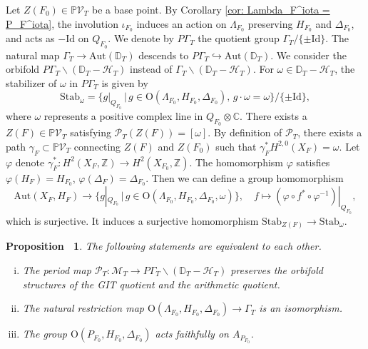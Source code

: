 \documentclass[12pt,reqno,a4paper]{amsart}
\newtheorem{prop}[thm]{Proposition~}
\theoremstyle{remark}
\theoremstyle{definition}
\begin{document}
Let $Z(F_0)\in\mathbb{P}\mathcal{V}_T$ be a base point.
By Corollary \ref{cor: Lambda_F^iota = P_F^iota}, the involution $\iota_{F_0}$ induces an action on $\Lambda_{F_0}$ preserving $H_{F_0}$ and $\Delta_{F_0}$, and acts as $-\mathrm{Id}$ on $Q_{F_0}$.
We denote by $P\Gamma_T$ the quotient group $\Gamma_T/\{\pm \mathrm{Id}\}$. The natural map $\Gamma_T \to \mathrm{Aut}(\mathbb{D}_T)$ descends to $P\Gamma_T \hookrightarrow \mathrm{Aut}(\mathbb{D}_T)$.  
We consider the orbifold $P\Gamma_T\backslash(\mathbb{D}_T-\mathcal{H}_T)$ instead of $\Gamma_T\backslash(\mathbb{D}_T-\mathcal{H}_T)$.
For $\omega\in \mathbb{D}_T-\mathcal{H}_T$, the stabilizer of $\omega$ in $P\Gamma_T$ is given by
\begin{equation*}
    \mathrm{Stab}_\omega = \{ g|_{Q_{F_0}} \,\big|\, g\in \mathrm{O}(\Lambda_{F_0},H_{F_0},\Delta_{F_0}),\, g\cdot\omega=\omega \}/\{\pm \mathrm{Id}\},
\end{equation*}
where $\omega$ represents a positive complex line in $Q_{F_0}\otimes\mathbb{C}$.
There exists a $Z(F)\in \mathbb{P}\mathcal{V}_T$ satisfying $\mathscr{P}_T(Z(F))=[\omega]$.
By definition of $\mathscr{P}_T$, there exists a path $\gamma_F\subset\mathbb{P}\mathcal{V}_T$ connecting $Z(F)$ and $Z(F_0)$ such that $\gamma_F^*H^{2,0}(X_F)=\omega$.
Let $\varphi$ denote $\gamma_F^*\colon H^2(X_F,\mathbb{Z})\to H^2(X_{F_0},\mathbb{Z})$.
The homomorphism $\varphi$ satisfies $\varphi(H_F)=H_{F_0}$, $\varphi(\Delta_F)=\Delta_{F_0}$.
Then we can define a group homomorphism
\begin{equation*}
    \mathrm{Aut}(X_F,H_F) \to \{ g|_{Q_{F_0}} \,\big|\, g\in \mathrm{O}(\Lambda_{F_0},H_{F_0},\Delta_{F_0},\omega) \},\quad f \mapsto (\varphi\circ f^*\circ\varphi^{-1})|_{Q_{F_0}},
\end{equation*}
which is surjective.
It induces a surjective homomorphism $\mathrm{Stab}_{Z(F)}\to\mathrm{Stab}_\omega$.
\begin{prop}
\label{prop: orbifold criterion}
    The following statements are equivalent to each other.
    \begin{enumerate}[(i)]
        \item The period map $\mathscr{P}_T\colon \mathcal{M}_T\to P\Gamma_T\backslash(\mathbb{D}_T-\mathcal{H}_T)$ preserves the orbifold structures of the GIT quotient and the arithmetic quotient.
        \item         The natural restriction map $\mathrm{O}(\Lambda_{F_0},H_{F_0},\Delta_{F_0})\to \Gamma_T$ is an isomorphism.
        \item The group $\mathrm{O}(P_{F_0},H_{F_0},\Delta_{F_0})$ acts faithfully on $A_{P_{F_0}}$.
    \end{enumerate}
\end{prop}
\end{document}
